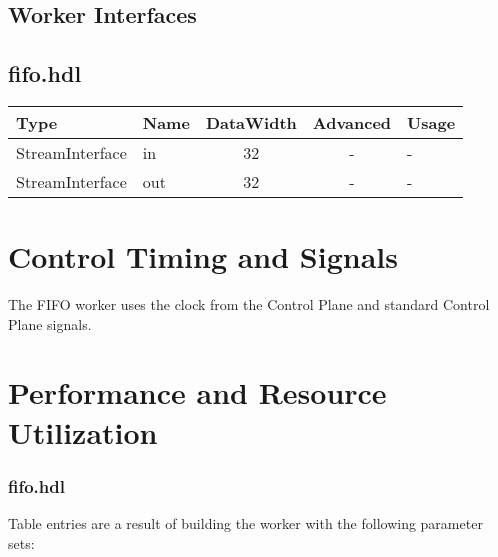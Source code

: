 \documentclass{article}
\def\comp{fifo}
\begin{document}
\begin{landscape}
  \section*{Worker Interfaces}
  \subsection*{\comp.hdl}
  \begin{scriptsize}
    \begin{tabular}{|M{2cm}|M{1.5cm}|c|c|M{14.5cm}|}
      \hline
      Type            & Name & DataWidth & Advanced                & Usage                  \\
      \hline
      StreamInterface & in   & 32        & - & - \\
      \hline
      StreamInterface & out  & 32        & - & - \\
      \hline
    \end{tabular}
  \end{scriptsize}
\end{landscape}

\section*{Control Timing and Signals}
\begin{flushleft}
  The FIFO worker uses the clock from the Control Plane and standard Control Plane signals.
\end{flushleft}

\section*{Performance and Resource Utilization}
\subsubsection*{\comp.hdl}
Table entries are a result of building the worker with the following parameter sets:\
\end{document}
